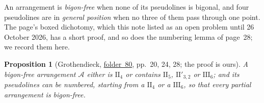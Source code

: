 \documentclass[11pt]{article}
\newcommand{\fac}[1]{\href{https://grothendieck.umontpellier.fr/#1.pdf}{folder~#1}}
\theoremstyle{definition}
\theoremstyle{plain}\newtheorem*{proposition}{Proposition}\theoremstyle{definition}
\begin{document}
An arrangement is \emph{bigon-free} when none of its pseudolines is bigonal, and four pseudolines are in \emph{general position} when no three of them pass through one point. The page's boxed dichotomy, which this note listed as an open problem until 26 October 2026, has a short proof, and so does the numbering lemma of page~28; we record them here.

\begin{proposition}[Grothendieck, \fac{80}, pp.~20, 24, 28; the proof is ours]
A bigon-free arrangement $\mathcal A$ either is $\mathrm{II}_4$ or contains $\mathrm{II}_5$, $\mathrm{II}'_{3,2}$ or $\mathrm{III}_6$; and its pseudolines can be numbered, starting from a $\mathrm{II}_4$ or a $\mathrm{III}_6$, so that every partial arrangement is bigon-free.
\end{proposition}
\end{document}
